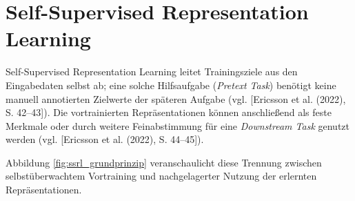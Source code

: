 \section{Self-Supervised Representation Learning}
Self-Supervised Representation Learning leitet Trainingsziele aus den Eingabedaten selbst ab; eine solche Hilfsaufgabe (\textit{Pretext Task}) benötigt keine manuell annotierten Zielwerte der späteren Aufgabe (vgl. [Ericsson et al. (2022), S. 42--43]). Die vortrainierten Repräsentationen können anschließend als feste Merkmale oder durch weitere Feinabstimmung für eine \textit{Downstream Task} genutzt werden (vgl. [Ericsson et al. (2022), S. 44--45]).

Abbildung \ref{fig:ssrl_grundprinzip} veranschaulicht diese Trennung
zwischen selbstüberwachtem Vortraining und nachgelagerter Nutzung der
erlernten Repräsentationen.

